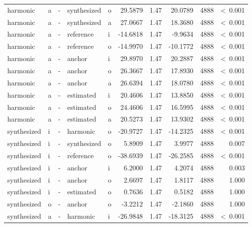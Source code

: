 \documentclass[a4paper,man,hidelinks,floatsintext]{apa7}
\begin{document}
\begin{table}[!htbp]
\begin{adjustbox}{max size={\columnwidth}{\textheight}}
\begin{tabular}{llrllrrrrr}
harmonic    & a     & - & synthesized & o     &    29.5879 & 1.47 &  20.0789 & 4888 &  \textless~0.001 \\
harmonic    & a     & - & synthesized & a     &    27.0667 & 1.47 &  18.3680 & 4888 &  \textless~0.001 \\
harmonic    & a     & - & reference   & i     &   -14.6818 & 1.47 &  -9.9634 & 4888 &  \textless~0.001 \\
harmonic    & a     & - & reference   & o     &   -14.9970 & 1.47 & -10.1772 & 4888 &  \textless~0.001 \\
harmonic    & a     & - & anchor      & i     &    29.8970 & 1.47 &  20.2887 & 4888 &  \textless~0.001 \\
harmonic    & a     & - & anchor      & o     &    26.3667 & 1.47 &  17.8930 & 4888 &  \textless~0.001 \\
harmonic    & a     & - & anchor      & a     &    26.6394 & 1.47 &  18.0780 & 4888 &  \textless~0.001 \\
harmonic    & a     & - & estimated   & i     &    20.4606 & 1.47 &  13.8850 & 4888 &  \textless~0.001 \\
harmonic    & a     & - & estimated   & o     &    24.4606 & 1.47 &  16.5995 & 4888 &  \textless~0.001 \\
harmonic    & a     & - & estimated   & a     &    20.5273 & 1.47 &  13.9302 & 4888 &  \textless~0.001 \\
synthesized & i     & - & harmonic    & o     &   -20.9727 & 1.47 & -14.2325 & 4888 &  \textless~0.001 \\
synthesized & i     & - & synthesized & o     &     5.8909 & 1.47 &   3.9977 & 4888 &            0.007 \\
synthesized & i     & - & reference   & o     &   -38.6939 & 1.47 & -26.2585 & 4888 &  \textless~0.001 \\
synthesized & i     & - & anchor      & i     &     6.2000 & 1.47 &   4.2074 & 4888 &            0.003 \\
synthesized & i     & - & anchor      & o     &     2.6697 & 1.47 &   1.8117 & 4888 &            1.000 \\
synthesized & i     & - & estimated   & o     &     0.7636 & 1.47 &   0.5182 & 4888 &            1.000 \\
synthesized & o     & - & anchor      & o     &    -3.2212 & 1.47 &  -2.1860 & 4888 &            1.000 \\
synthesized & a     & - & harmonic    & i     &   -26.9848 & 1.47 & -18.3125 & 4888 &  \textless~0.001 \\

\end{tabular}
\end{adjustbox}
\end{table}
\end{document}
